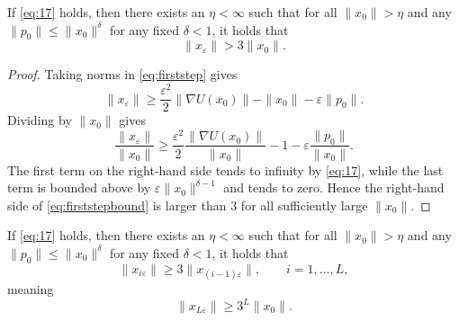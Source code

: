 \begin{lemma515}
If \eqref{eq:17} holds, then there exists an $\eta<\infty$ such that for all
$\|x_0\|>\eta$ and any $\|p_0\|\leq\|x_0\|^\delta$ for any fixed $\delta<1$, it
holds that
\[
 \|x_{\varepsilon}\|>3\|x_0\|.
\]
\end{lemma515}

\begin{proof}
Taking norms in \eqref{eq:firststep} gives
\[
 \|x_{\varepsilon}\|
 \geq
 \frac{\varepsilon^2}{2}\|\nabla U(x_0)\|
 -\|x_0\|-\varepsilon\|p_0\|.
\]
Dividing by $\|x_0\|$ gives
\begin{equation}
 \frac{\|x_{\varepsilon}\|}{\|x_0\|}
 \geq
 \frac{\varepsilon^2}{2}
 \frac{\|\nabla U(x_0)\|}{\|x_0\|}
 -1-\varepsilon\frac{\|p_0\|}{\|x_0\|}.
 \label{eq:firststepbound}
\end{equation}
The first term on the right-hand side tends to infinity by \eqref{eq:17},
while the last term is bounded above by
$\varepsilon\|x_0\|^{\delta-1}$ and tends to zero. Hence the right-hand side
of \eqref{eq:firststepbound} is larger than $3$ for all sufficiently large
$\|x_0\|$.
\end{proof}

\begin{lemma516}
If \eqref{eq:17} holds, then there exists an $\eta<\infty$ such that for all
$\|x_0\|>\eta$ and any $\|p_0\|\leq\|x_0\|^\delta$ for any fixed $\delta<1$, it
holds that
\begin{equation}
 \|x_{i\varepsilon}\|\geq3\|x_{(i-1)\varepsilon}\|,
 \qquad i=1,\ldots,L,
 \label{eq:stepwiseexpansion}
\end{equation}
meaning
\begin{equation}
 \|x_{L\varepsilon}\|\geq3^L\|x_0\|.
 \label{eq:3Lexpansion}
\end{equation}
\end{lemma516}

